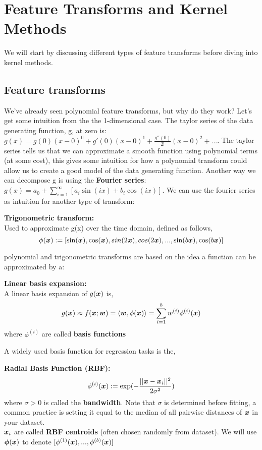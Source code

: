 \section{Feature Transforms and Kernel Methods}
We will start by discussing different types of feature transforms before diving into kernel methods.

\subsection{Feature transforms}
We've already seen polynomial feature transforms, but why do they work? Let's get some intuition from the the 1-dimensional case. The taylor series of the data generating function, g, at zero is: $g(x) = g(0) (x-0)^{0} +g'(0)(x-0)^{1} + \frac{g''(0)}{2!}(x-0)^{2} + ...$. The taylor series tells us that we can approximate a smooth function using polynomial terms (at some cost), this gives some intuition for how a polynomial transform could allow us to create a good model of the data generating function. Another way we can decompose g is using the \textbf{Fourier series}: $g(x) = a_{0} + \sum_{i=1}^{\infty} [a_{i} \sin(ix) + b_{i} \cos(ix)]$. We can use the fourier series as intuition for another type of transform:
\begin{definition}
    \textbf{Trigonometric transform:} \\
    Used to approximate g(x) over the time domain, defined as follows,
    \begin{equation}
        \phi(\bm{x}) := [\sin(\bm{x}), \cos(\bm{x}), sin(2\bm{x}), cos(2\bm{x}), ..., \sin(b\bm{x}), \cos(b\bm{x})]
    \end{equation}
\end{definition}
polynomial and trigonometric transforms are based on the idea a function can be approximated by a:
\begin{definition}
    \textbf{Linear basis expansion:} \\
    A linear basis expansion of $g(\bm{x})$ is,
    \begin{equation}
        g(\bm{x}) \approx f(\bm{x}; \bm{w}) = \langle \bm{w} , \phi(\bm{x}) \rangle = \sum_{i=1}^{b} w^{(i)} \phi^{(i)} (\bm{x})
    \end{equation}
    where $\phi^{(i)}$ are called \textbf{basis functions}
\end{definition}
A widely used basis function for regression tasks is the,
\begin{definition}
    \textbf{Radial Basis Function (RBF):}
    \begin{equation}
        \phi^{(i)}(\bm{x}) := \exp(- \frac{|| \bm{x} - \bm{x}_{i} ||^{2}}{2 \sigma^{2}})
    \end{equation}
    where $\sigma >0$ is called the \textbf{bandwidth}. Note that $\sigma$ is determined before fitting, a common practice is setting it equal to the median of all pairwise distances of $\bm{x}$ in your dataset. \\
    $\bm{x}_{i}$ are called \textbf{RBF centroids} (often chosen randomly from dataset). We will use $\bm{\phi}(\bm{x})$ to denote $[\phi^{(1)}(\bm{x}),...,\phi^{(b)}(\bm{x})]$
\end{definition}
